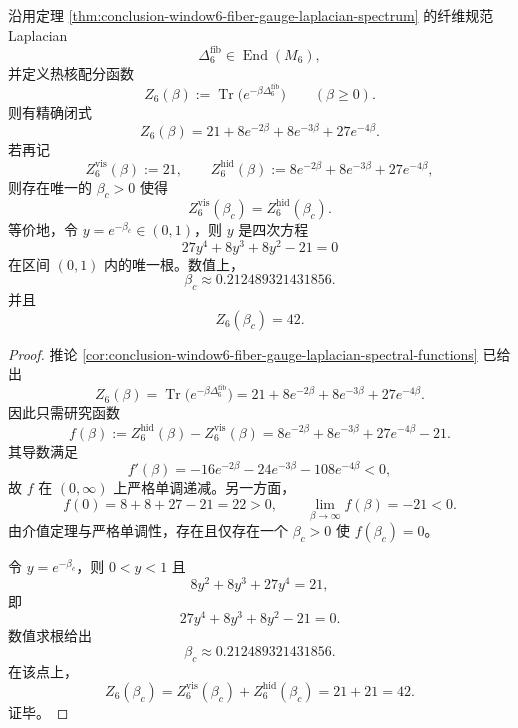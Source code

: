 \begin{theorem}\label{thm:conclusion-window6-visible-hidden-thermal-crossover}
沿用定理 \ref{thm:conclusion-window6-fiber-gauge-laplacian-spectrum} 的纤维规范 Laplacian
\[
\Delta_6^{\mathrm{fib}}
\in
\operatorname{End}(M_6),
\]
并定义热核配分函数
\[
Z_6(\beta):=\operatorname{Tr}\!\bigl(e^{-\beta \Delta_6^{\mathrm{fib}}}\bigr)
\qquad (\beta\ge 0).
\]
则有精确闭式
\[
Z_6(\beta)=21+8e^{-2\beta}+8e^{-3\beta}+27e^{-4\beta}.
\]
若再记
\[
Z_6^{\mathrm{vis}}(\beta):=21,
\qquad
Z_6^{\mathrm{hid}}(\beta):=8e^{-2\beta}+8e^{-3\beta}+27e^{-4\beta},
\]
则存在唯一的 \(\beta_c>0\) 使得
\[
Z_6^{\mathrm{vis}}(\beta_c)=Z_6^{\mathrm{hid}}(\beta_c).
\]
等价地，令 \(y=e^{-\beta_c}\in(0,1)\)，则 \(y\) 是四次方程
\[
27y^4+8y^3+8y^2-21=0
\]
在区间 \((0,1)\) 内的唯一根。数值上，
\[
\beta_c\approx 0.212489321431856.
\]
并且
\[
Z_6(\beta_c)=42.
\]
\end{theorem}
\begin{proof}
推论 \ref{cor:conclusion-window6-fiber-gauge-laplacian-spectral-functions} 已给出
\[
Z_6(\beta)
=
\operatorname{Tr}\!\bigl(e^{-\beta \Delta_6^{\mathrm{fib}}}\bigr)
=
21+8e^{-2\beta}+8e^{-3\beta}+27e^{-4\beta}.
\]
因此只需研究函数
\[
f(\beta):=Z_6^{\mathrm{hid}}(\beta)-Z_6^{\mathrm{vis}}(\beta)
=
8e^{-2\beta}+8e^{-3\beta}+27e^{-4\beta}-21.
\]
其导数满足
\[
f'(\beta)=-16e^{-2\beta}-24e^{-3\beta}-108e^{-4\beta}<0,
\]
故 \(f\) 在 \((0,\infty)\) 上严格单调递减。另一方面，
\[
f(0)=8+8+27-21=22>0,
\qquad
\lim_{\beta\to\infty}f(\beta)=-21<0.
\]
由介值定理与严格单调性，存在且仅存在一个 \(\beta_c>0\) 使 \(f(\beta_c)=0\)。

令 \(y=e^{-\beta_c}\)，则 \(0<y<1\) 且
\[
8y^2+8y^3+27y^4=21,
\]
即
\[
27y^4+8y^3+8y^2-21=0.
\]
数值求根给出
\[
\beta_c\approx 0.212489321431856.
\]
在该点上，
\[
Z_6(\beta_c)=Z_6^{\mathrm{vis}}(\beta_c)+Z_6^{\mathrm{hid}}(\beta_c)=21+21=42.
\]
证毕。
\end{proof}


